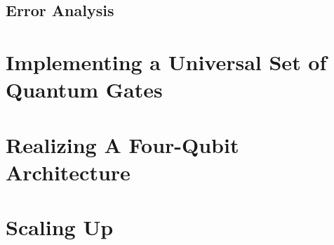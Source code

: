 \subsection{Error Analysis}

\section{Implementing a Universal Set of Quantum Gates}

\section{Realizing A Four-Qubit Architecture}


\section{Scaling Up}

